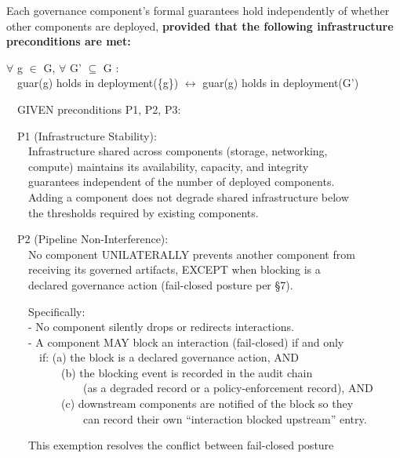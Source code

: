 \begin{caxiom}

Each governance component's formal guarantees hold independently of whether other components are deployed, \textbf{provided that the following infrastructure preconditions are met:}

\begin{claddisp}
$\forall$ g $\in$ G, $\forall$ G' $\subseteq$ G :\\
~~guar(g) holds in deployment(\{g\}) $\leftrightarrow$ guar(g) holds in deployment(G')
\par\smallskip
~~GIVEN preconditions P1, P2, P3:
\par\smallskip
~~P1 (Infrastructure Stability):\\
~~~~Infrastructure shared across components (storage, networking,\\
~~~~compute) maintains its availability, capacity, and integrity\\
~~~~guarantees independent of the number of deployed components.\\
~~~~Adding a component does not degrade shared infrastructure below\\
~~~~the thresholds required by existing components.
\par\smallskip
~~P2 (Pipeline Non-Interference):\\
~~~~No component UNILATERALLY prevents another component from\\
~~~~receiving its governed artifacts, EXCEPT when blocking is a\\
~~~~declared governance action (fail-closed posture per \S{}7).
\par\smallskip
~~~~Specifically:\\
~~~~- No component silently drops or redirects interactions.\\
~~~~- A component MAY block an interaction (fail-closed) if and only\\
~~~~~~if: (a) the block is a declared governance action, AND\\
~~~~~~~~~~(b) the blocking event is recorded in the audit chain\\
~~~~~~~~~~~~~~(as a degraded record or a policy-enforcement record), AND\\
~~~~~~~~~~(c) downstream components are notified of the block so they\\
~~~~~~~~~~~~~~can record their own ``interaction blocked upstream'' entry.
\par\smallskip
~~~~This exemption resolves the conflict between fail-closed posture\\

\end{claddisp}
\end{caxiom}

